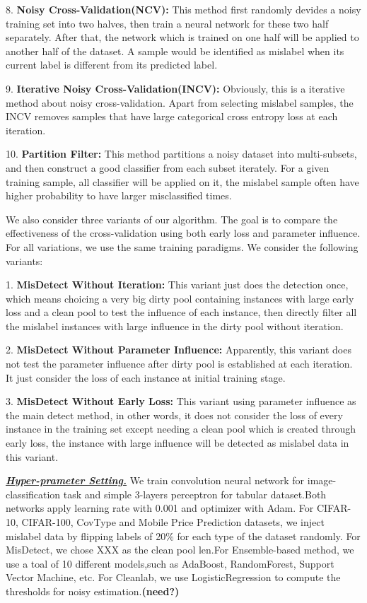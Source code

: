8. \textbf{Noisy Cross-Validation(NCV):} This method first randomly devides a noisy training set into two halves, then train a neural network for these two half separately. After that, the network which is trained on one half will be applied to another half of the dataset. A sample would be identified as mislabel when its current label is different from its predicted label.

9. \textbf{Iterative Noisy Cross-Validation(INCV):} Obviously, this is a iterative method about noisy cross-validation. Apart from selecting mislabel samples, the INCV removes samples that have large categorical cross entropy loss at each iteration.

10. \textbf{Partition Filter:} This method partitions a noisy dataset into multi-subsets, and then construct a good classifier from each subset iterately. For a given training sample, all classifier will be applied on it, the mislabel sample often have higher probability to have larger misclassified times.

We also consider three variants of our algorithm. The goal is to compare the effectiveness of the cross-validation using both early loss and parameter influence. For all variations, we use the same training paradigms. We consider the following variants:

1. \textbf{MisDetect Without Iteration: } This variant just does the detection once, which means choicing a very big dirty pool containing instances with large early loss and a clean pool to test the influence of each instance, then directly filter all the mislabel instances with large influence in the dirty pool without iteration.

2. \textbf{MisDetect Without Parameter Influence:} Apparently, this variant does not test the parameter influence after dirty pool is established at each iteration. It just consider the loss of each instance at initial training stage.

3. \textbf{MisDetect Without Early Loss:} This variant using parameter influence as the main detect method, in other words, it does not consider the loss of every instance in the training set except needing a clean pool which is created through early loss, the instance with large influence will be detected as mislabel data in this variant.

\textbf{\textit{\underline{Hyper-prameter Setting.}}} We train convolution neural network for image-classification task and simple 3-layers perceptron for tabular dataset.Both networks apply learning rate with 0.001 and optimizer with Adam. For CIFAR-10, CIFAR-100, CovType and Mobile Price Prediction datasets, we inject mislabel data by flipping labels of 20\% for each type of the dataset randomly. For MisDetect, we chose XXX as the clean pool len.For Ensemble-based method, we use a toal of 10 different models,such as AdaBoost, RandomForest, Support Vector Machine, etc. For Cleanlab, we use LogisticRegression to compute the thresholds for noisy estimation.\textbf{(need?)}

